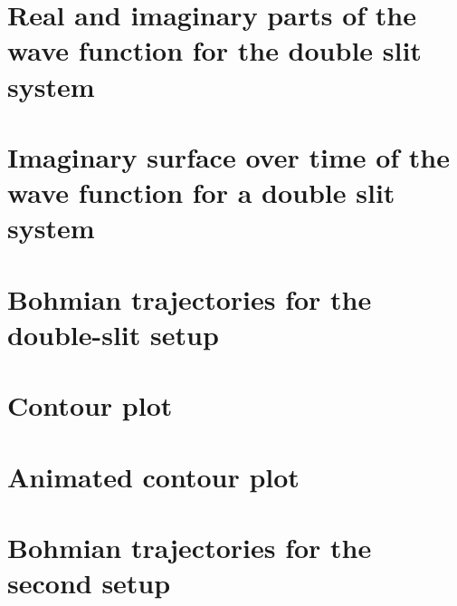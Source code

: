 \documentclass[10pt, reqno]{article}
\begin{document}
\section{Real and imaginary parts of the wave function for the double slit system}
\label{appendix:real-imag}

\pagebreak

\section{Imaginary surface over time of the wave function for a double slit system}
\label{appendix:imaginary-surface}

\pagebreak 

\section{Bohmian trajectories for the double-slit setup}
\label{appendix:bohmian-trajectories}

\pagebreak 

\section{Contour plot}
\label{appendix:contour-plot}

\pagebreak 

\section{Animated contour plot}
\label{appendix:contour-plot-animated}

\pagebreak 

\section{Bohmian trajectories for the second setup}
\label{appendix:secondary-trajectories}

\pagebreak 
\end{document}
